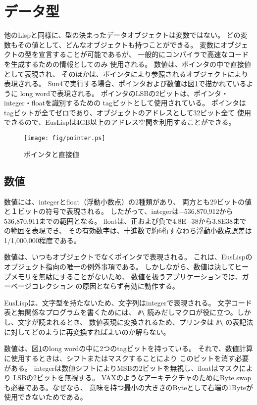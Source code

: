 \section{データ型}
他のLispと同様に、型の決まったデータオブジェクトは変数ではない。
どの変数もその値として、どんなオブジェクトも持つことができる。
変数にオブジェクトの型を宣言することが可能であるが、
一般的にコンパイラで高速なコードを生成するための情報としてのみ
使用される。
数値は、ポインタの中で直接値として表現され、
そのほかは、ポインタにより参照されるオブジェクトにより表現される。
Sun4で実行する場合、ポインタおよび数値は図\ref{Pointer}で描かれているように
long wordで表現される。
ポインタのLSBの2ビットは、ポインタ・integer・floatを識別するための
tagビットとして使用されている。
ポインタはtagビットが全てゼロであり、オブジェクトのアドレスとして32ビット全て
使用できるので、EusLispは4GB以上のアドレス空間を利用することができる。

\begin{figure}[hb]
\begin{center}
\texttt{[image: fig/pointer.ps]}
\end{center}
\caption{\label{Pointer}ポインタと直接値}
\end{figure}

\subsection{数値}
数値には、integerとfloat（浮動小数点）の2種類があり、
両方とも29ビットの値と１ビットの符号で表現される。
したがって、integerは$-$536,870,912から536,870,911までの範囲となる。
floatは、正および負で4.8E$-$38から3.8E38までの範囲を表現でき、
その有効数字は、十進数で約6桁すなわち浮動小数点誤差は1/1,000,000程度である。

数値は、いつもオブジェクトでなくポインタで表現される。
これは、EusLispのオブジェクト指向の唯一の例外事項である。
しかしながら、数値は決してヒープメモリを無駄にすることがないため、
数値を扱うアプリケーションでは、ガーベージコレクション
の原因とならず有効に動作する。

EusLispは、文字型を持たないため、文字列はintegerで表現される。
文字コード表と無関係なプログラムを書くためには、
\verb+#\+ 読みだしマクロが役に立つ。しかし、文字が読まれるとき、
数値表現に変換されるため、プリンタは
\verb+#\+ の表記法に対してどのように再変換すればよいのか解らない。

数値は、図\ref{Pointer}のlong wordの中に2つのtagビットを持っている。
それで、数値計算に使用するときは、シフトまたはマスクすることにより
このビットを消す必要がある。
integerは数値シフトによりMSBの2ビットを無視し、floatはマスクにより
LSBの2ビットを無視する。
VAXのようなアーキテクチャのためにByte swapも必要である。なぜなら、
意味を持つ最小の大きさのByteとして右端の1Byteが使用できないためである。


